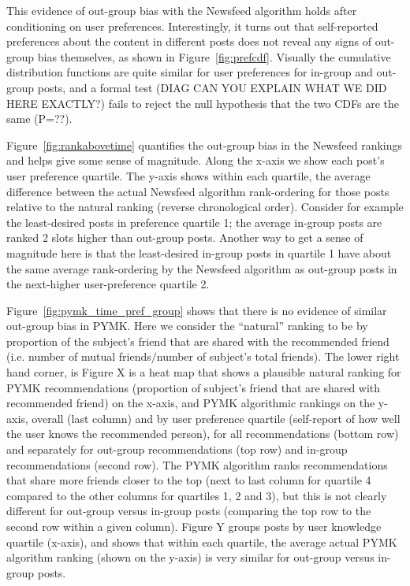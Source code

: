 \documentclass[12pt,letterpaper]{article}
\begin{document}
This evidence of out-group bias with the Newsfeed algorithm holds after conditioning on user preferences. Interestingly, it turns out that self-reported preferences about the content in different posts does not reveal any signs of out-group bias themselves, as shown in Figure~\ref{fig:prefcdf}. Visually the cumulative distribution functions are quite similar for user preferences for in-group and out-group posts, and a formal test (DIAG CAN YOU EXPLAIN WHAT WE DID HERE EXACTLY?) fails to reject the null hypothesis that the two CDFs are the same (P=??).

Figure~\ref{fig:rankabovetime} quantifies the out-group bias in the Newsfeed rankings and helps give some sense of magnitude. Along the x-axis we show each post's user preference quartile. The y-axis shows within each quartile, the average difference between the actual Newsfeed algorithm rank-ordering for those posts relative to the natural ranking (reverse chronological order). Consider for example the least-desired posts in preference quartile 1; the average in-group posts are ranked 2 slots higher than out-group posts. Another way to get a sense of magnitude here is that the least-desired in-group posts in quartile 1 have about the same average rank-ordering by the Newsfeed algorithm as out-group posts in the next-higher user-preference quartile 2.



Figure~\ref{fig:pymk_time_pref_group} shows that there is no evidence of similar out-group bias in PYMK. Here we consider the ``natural'' ranking to be by proportion of the subject's friend that are shared with the recommended friend (i.e. number of mutual friends$/$number of subject's total friends). The lower right hand corner, is  Figure X is a heat map that shows a plausible natural ranking for PYMK recommendations (proportion of subject's friend that are shared with recommended friend) on the x-axis, and PYMK algorithmic rankings on the y-axis, overall (last column) and by user preference quartile (self-report of how well the user knows the recommended person), for all recommendations (bottom row) and separately for out-group recommendations (top row) and in-group recommendations (second row). The PYMK algorithm ranks recommendations that share more friends closer to the top (next to last column for quartile 4 compared to the other columns for quartiles 1, 2 and 3), but this is not clearly different for out-group versus in-group posts (comparing the top row to the second row within a given column). Figure Y groups posts by user knowledge quartile (x-axis), and shows that within each quartile, the average actual PYMK algorithm ranking (shown on the y-axis) is very similar for out-group versus in-group posts.
\end{document}
